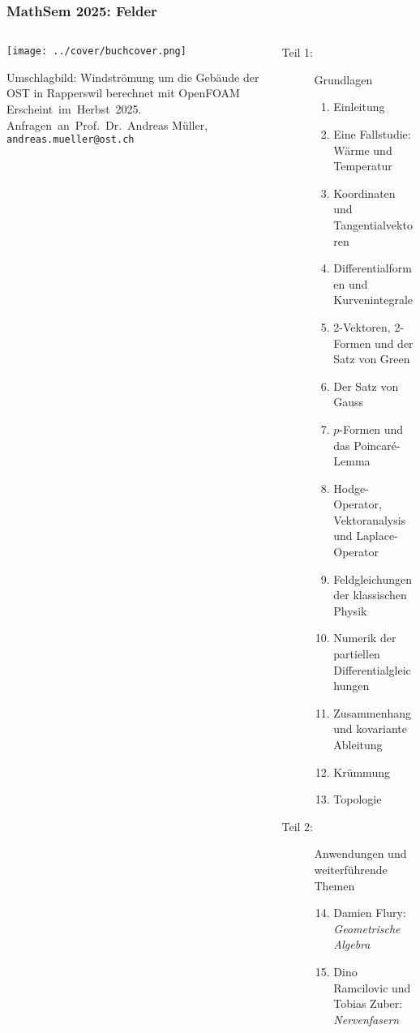 \documentclass[handout]{beamer}
\title[]{}
\begin{document}
\begin{frame}
\frametitle{%
MathSem 2025: Felder}
\vspace*{-0.1cm}
\begin{columns}[t,onlytextwidth]
\begin{column}{0.37\textwidth}
\begin{center}
\texttt{[image: ../cover/buchcover.png]}
\end{center}
\bigskip
Umschlagbild: Windströmung um die Gebäude der OST in Rapperswil
berechnet mit OpenFOAM
\bigskip
\bigskip
Erscheint~im~Herbst~2025.\\
Anfragen~an~Prof.~Dr.~Andreas Müller,\\
{\texttt{andreas.mueller@ost.ch}}
\bigskip
\bigskip
\bigskip
\end{column}
%
\begin{column}{0.60\textwidth}
\begin{description}
\item[Teil 1:] Grundlagen
\begin{enumerate}
\item Einleitung
\item Eine Fallstudie: Wärme und Temperatur
\item Koordinaten und Tangentialvektoren
\item Differentialformen und Kurvenintegrale
\item 2-Vektoren, 2-Formen und der Satz von Green
\item Der Satz von Gauss
\item $p$-Formen und das Poincaré-Lemma
\item Hodge-Operator, Vektoranalysis und Laplace-Operator
\item Feldgleichungen der klassischen Physik
\item Numerik der partiellen Differentialgleichungen
\item Zusammenhang und kovariante Ableitung
\item Krümmung
\item Topologie
\end{enumerate}
\item[Teil 2:] Anwendungen und weiterführende Themen
\begin{enumerate}
\setcounter{enumi}{13}
\item Damien Flury: {\em Geometrische Algebra}
\item Dino Ramcilovic und Tobias Zuber: {\em Nervenfasern}

\end{enumerate}
\end{description}
\end{column}
\end{columns}
\end{frame}
\end{document}
